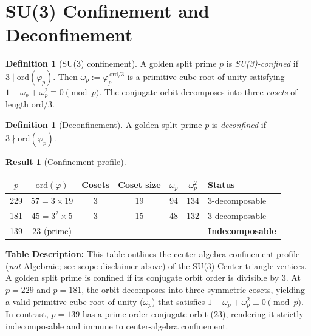 \documentclass[12pt,oneside]{article}
\theoremstyle{principia}
\theoremstyle{definition}
\newtheorem{definition}[theorem]{Definition}
\newtheorem{result}[theorem]{Result}
\theoremstyle{remark}
\begin{document}
\section{SU(3) Confinement and Deconfinement}
\label{sec:confinement}



\begin{definition}[SU(3) confinement]
A golden split prime $p$ is \emph{SU(3)-confined} if
$3 \mid \mathrm{ord}(\bar\varphi_p)$.
Then $\omega_p := \bar\varphi_p^{\,\mathrm{ord}/3}$
is a primitive cube root of unity satisfying
$1 + \omega_p + \omega_p^2 \equiv 0 \pmod{p}$.
The conjugate orbit decomposes into three \emph{cosets}
of length $\mathrm{ord}/3$.
\end{definition}

\begin{definition}[Deconfinement]
A golden split prime $p$ is \emph{deconfined} if
$3 \nmid \mathrm{ord}(\bar\varphi_p)$.
\end{definition}

\begin{result}[Confinement profile]
\label{res:confinement}
~
\begin{center}
\begin{tabular}{@{}ccccccl@{}}
\toprule
$p$ & $\mathrm{ord}(\bar\varphi)$ & Cosets & Coset size
    & $\omega_p$ & $\omega_p^2$ & Status \\
\midrule
229 & $57 = 3 \times 19$ & 3 & 19 & 94 & 134 & 3-decomposable \\
181 & $45 = 3^2 \times 5$ & 3 & 15 & 48 & 132 & 3-decomposable \\
139 & $23$ (prime) & --- & --- & --- & --- & \textbf{Indecomposable} \\
\bottomrule
\end{tabular}
\end{center}
\textbf{Table Description:} This table outlines the center-algebra confinement profile (\emph{not} Algebraic; see scope disclaimer above) of the SU(3) Center triangle vertices. A golden split prime is confined if its conjugate orbit order is divisible by 3. At $p=229$ and $p=181$, the orbit decomposes into three symmetric cosets, yielding a valid primitive cube root of unity ($\omega_p$) that satisfies $1 + \omega_p + \omega_p^2 \equiv 0 \pmod{p}$. In contrast, $p=139$ has a prime-order conjugate orbit (23), rendering it strictly indecomposable and immune to center-algebra confinement.
\end{result}
\end{document}

